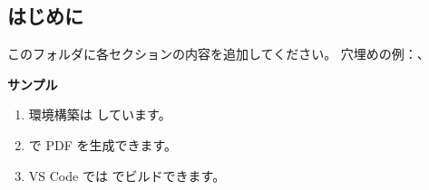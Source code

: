 
\subsection{はじめに}\vspace{-0.2em}
    このフォルダに各セクションの内容を追加してください。
    穴埋めの例：、

\begin{definitionbox}{\textbf{サンプル}}
    \begin{enumerate}[nosep, topsep=0pt, itemsep=0.42em]
        \item 環境構築は  しています。
        \item {} で PDF を生成できます。
        \item VS Code では  でビルドできます。
    \end{enumerate}
\end{definitionbox}

\vfill
